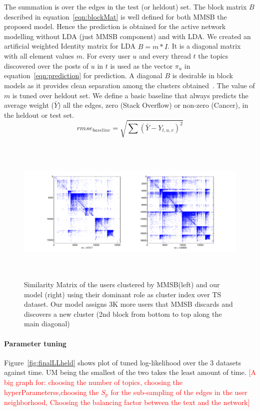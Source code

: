\documentclass{sig-alternate}
\newcommand{\comment}[1]{\textcolor{red}{[#1]}}
\begin{document}
The summation is over the edges in the test (or heldout) set. The block matrix
$B$ described in equation~\ref{eqn:blockMat} is well defined for both MMSB the proposed
model. Hence the prediction is obtained for the active network modelling without
LDA (just MMSB component) and with LDA. We created an artificial
weighted Identity matrix for LDA $\hat{B}=m*I$. It is a diagonal matrix with
all element values $m$. For every user $u$ and every thread $t$ the topics discovered over the
posts of $u$ in $t$ is used as the vector $\pi_u$ in
equation~\ref{eqn:prediction} for prediction. A diagonal $B$ is desirable in
block models as it provides clean separation among the clusters
obtained~\cite{Airoldi:2008:MMS:1390681.1442798}.
The value of $m$ is tuned over heldout set. We define a basic baseline that
always predicts the average weight ($\bar{Y}$) all the edges, zero (Stack
Overflow) or non-zero (Cancer), in the heldout or test set.
\begin{equation}
rmse_{baseline} = \sqrt{\sum(\bar{Y}-Y_{t,u,v})^2}
\end{equation}
\begin{center}
\begin{figure}
\includegraphics[height=7cm,width=18cm]{SimilarityMatTS.pdf}
\caption{Similarity Matrix of the users clustered by MMSB(left) and our model
(right) using their dominant role as cluster index over TS dataset. Our model
assigns 3K more users that MMSB discards and discovers a new cluster (2nd block
from bottom to top along the main diagonal)}
\label{fig:similarityMatTS}
\end{figure}
\end{center}

\paragraph{Parameter tuning}
Figure~\ref{fig:finalLLheld} shows plot of tuned log-likelihood over the 3
datasets against time. UM being the smallest of the two takes
the least amount of time. \comment{A big graph for: choosing the number of
topics, choosing the hyperParameterss,choosing the $S_p$ for the sub-sampling of
the edges in the user neighborhood, Choosing the balancing factor between the
text and the network}\\
\end{document}
